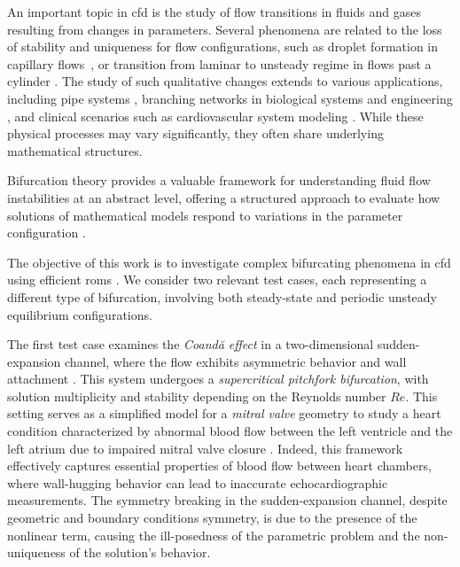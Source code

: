 \documentclass[reqno]{amsart}[standalone]
\theoremstyle{definition}
\theoremstyle{remark}
\begin{document}
An important topic in \gls{cfd} is the study of flow transitions in fluids and gases resulting from changes in parameters.
Several phenomena are related to the loss of stability and uniqueness for flow configurations, such as droplet formation in capillary flows~\parencite{Dijkstra_Wubs_2023, Dijkstra_Wubs_Cliffe_Doedel_Dragomirescu_Eckhardt_Gelfgat_Hazel_Lucarini_Salinger_et_al_2014}, or transition from laminar to unsteady regime in flows past a cylinder \parencite{Zdravkovich1997}.
The study of such qualitative changes extends to various applications, including pipe systems \parencite{Gavilan22}, branching networks in biological systems and engineering \parencite{PRADHAN2019108483}, and clinical scenarios such as cardiovascular system modeling \parencite{Pitton_2017_2}.
%
While these physical processes may vary significantly, they often share underlying mathematical structures.

Bifurcation theory provides a valuable framework for understanding fluid flow instabilities at an abstract level, offering a structured approach to evaluate how solutions of mathematical models respond to variations in the parameter configuration \parencite{Dijkstra_Wubs_2023}.

The objective of this work is to investigate complex bifurcating phenomena in \gls{cfd} using efficient \glspl{rom} \parencite{RozzaBallarinScandurraPichi2024, Benner2017, MOR}.
We consider two relevant test cases, each representing a different type of bifurcation, involving both steady-state and periodic unsteady equilibrium configurations.

The first test case examines the \emph{Coandă effect} in a two-dimensional sudden-expansion channel, where the flow exhibits asymmetric behavior and wall attachment \parencite{PichiDrivingBifurcatingParametrized2022a,Khamlich_2022}.
This system undergoes a \emph{supercritical pitchfork bifurcation}, with solution multiplicity and stability depending on the Reynolds number $Re$.
This setting serves as a simplified model for a \textit{mitral valve} geometry to study a heart condition characterized by abnormal blood flow between the left ventricle and the left atrium due to impaired mitral valve closure \parencite{tritton1977physical}. Indeed, this framework effectively captures essential properties of blood flow between heart chambers, where wall-hugging behavior can lead to inaccurate echocardiographic measurements.
The symmetry breaking in the sudden-expansion channel, despite geometric and boundary conditions symmetry, is due to the presence of the nonlinear term, causing the ill-posedness of the parametric problem and the non-uniqueness of the solution's behavior.
%
\end{document}
